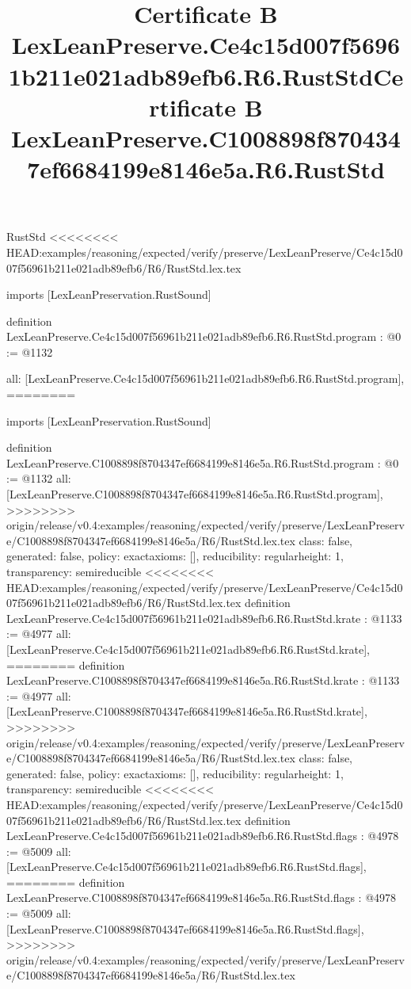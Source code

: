 \begin{lexlean}{RustStd}
<<<<<<<< HEAD:examples/reasoning/expected/verify/preserve/LexLeanPreserve/Ce4c15d007f56961b211e021adb89efb6/R6/RustStd.lex.tex
\title{Certificate B LexLeanPreserve.Ce4c15d007f56961b211e021adb89efb6.R6.RustStd}
\begin{coremodule}
imports [LexLeanPreservation.RustSound]

definition LexLeanPreserve.Ce4c15d007f56961b211e021adb89efb6.R6.RustStd.program : @0 := @1132 {
  all: [LexLeanPreserve.Ce4c15d007f56961b211e021adb89efb6.R6.RustStd.program],
========
\title{Certificate B LexLeanPreserve.C1008898f8704347ef6684199e8146e5a.R6.RustStd}
\begin{coremodule}
imports [LexLeanPreservation.RustSound]

definition LexLeanPreserve.C1008898f8704347ef6684199e8146e5a.R6.RustStd.program : @0 := @1132 {
  all: [LexLeanPreserve.C1008898f8704347ef6684199e8146e5a.R6.RustStd.program],
>>>>>>>> origin/release/v0.4:examples/reasoning/expected/verify/preserve/LexLeanPreserve/C1008898f8704347ef6684199e8146e5a/R6/RustStd.lex.tex
  class: false,
  generated: false,
  policy: exact{axioms: []},
  reducibility: regular{height: 1},
  transparency: semireducible
}
<<<<<<<< HEAD:examples/reasoning/expected/verify/preserve/LexLeanPreserve/Ce4c15d007f56961b211e021adb89efb6/R6/RustStd.lex.tex
definition LexLeanPreserve.Ce4c15d007f56961b211e021adb89efb6.R6.RustStd.krate : @1133 := @4977 {
  all: [LexLeanPreserve.Ce4c15d007f56961b211e021adb89efb6.R6.RustStd.krate],
========
definition LexLeanPreserve.C1008898f8704347ef6684199e8146e5a.R6.RustStd.krate : @1133 := @4977 {
  all: [LexLeanPreserve.C1008898f8704347ef6684199e8146e5a.R6.RustStd.krate],
>>>>>>>> origin/release/v0.4:examples/reasoning/expected/verify/preserve/LexLeanPreserve/C1008898f8704347ef6684199e8146e5a/R6/RustStd.lex.tex
  class: false,
  generated: false,
  policy: exact{axioms: []},
  reducibility: regular{height: 1},
  transparency: semireducible
}
<<<<<<<< HEAD:examples/reasoning/expected/verify/preserve/LexLeanPreserve/Ce4c15d007f56961b211e021adb89efb6/R6/RustStd.lex.tex
definition LexLeanPreserve.Ce4c15d007f56961b211e021adb89efb6.R6.RustStd.flags : @4978 := @5009 {
  all: [LexLeanPreserve.Ce4c15d007f56961b211e021adb89efb6.R6.RustStd.flags],
========
definition LexLeanPreserve.C1008898f8704347ef6684199e8146e5a.R6.RustStd.flags : @4978 := @5009 {
  all: [LexLeanPreserve.C1008898f8704347ef6684199e8146e5a.R6.RustStd.flags],
>>>>>>>> origin/release/v0.4:examples/reasoning/expected/verify/preserve/LexLeanPreserve/C1008898f8704347ef6684199e8146e5a/R6/RustStd.lex.tex
}}}
\end{coremodule}}
\end{coremodule}
\end{lexlean}
